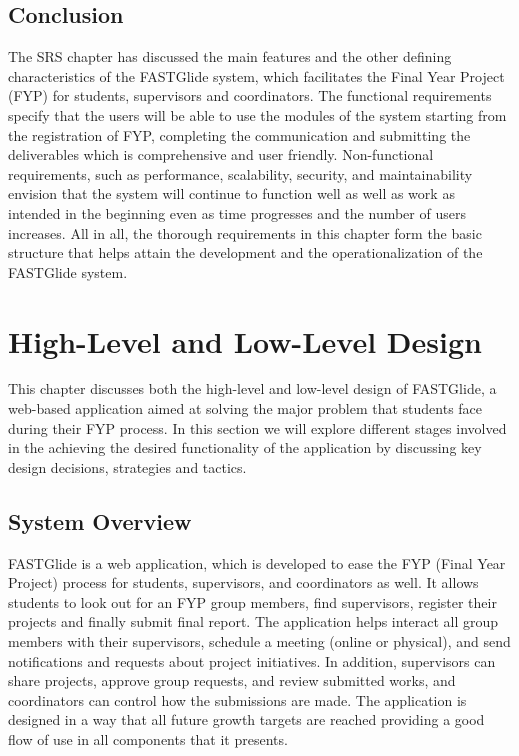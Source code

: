 \documentclass{FastFyp}
\begin{document}
\section{Conclusion}
The SRS chapter has discussed the main features and the other defining characteristics of the FASTGlide system, which facilitates the Final Year Project (FYP) for students, supervisors and coordinators. The functional requirements specify that the users will be able to use the modules of the system starting from the registration of FYP, completing the communication and submitting the deliverables which is comprehensive and user friendly. Non-functional requirements, such as performance, scalability, security, and maintainability envision that the system will continue to function well as well as work as intended in the beginning even as time progresses and the number of users increases. All in all, the thorough requirements in this chapter form the basic structure that helps attain the development and the operationalization of the FASTGlide system.

\chapter{High-Level and Low-Level Design}
This chapter discusses both the high-level and low-level design of FASTGlide, a web-based 
application aimed at solving the major problem that students face during their FYP process. In this 
section we will explore different stages involved in the achieving the desired functionality of the 
application by discussing key design decisions, strategies and tactics.
\section{System Overview}
FASTGlide is a web application, which is developed to ease the FYP (Final Year Project) process for students, supervisors, and coordinators as well. It allows students to look out for an FYP group members, find supervisors, register their projects and finally submit final report. The application helps interact all group members with their supervisors, schedule a meeting (online or physical), and send notifications and requests about project initiatives. In addition, supervisors can share projects, approve group requests, and review submitted works, and coordinators can control how the submissions are made. The application is designed in a way that all future growth targets are reached providing a good flow of use in all components that it presents.
\end{document}
